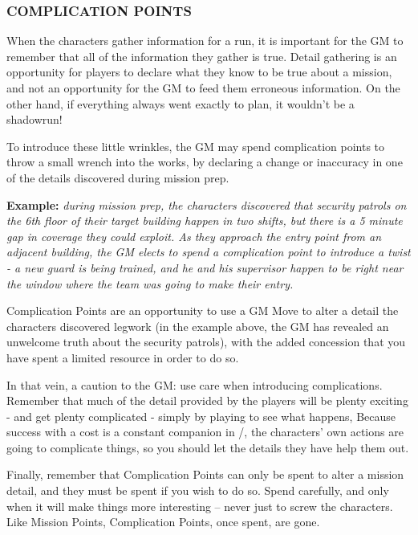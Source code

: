 \documentclass[oneside,10pt]{article}
\begin{document}
\begin{multicols}{2}
  \subsubsection{COMPLICATION POINTS}
  When the characters gather information for a run, it is important
  for the GM to remember that all of the information they gather is
  true. Detail gathering is an opportunity for players to declare what
  they know to be true about a mission, and not an opportunity for the
  GM to feed them erroneous information. On the other hand, if
  everything always went exactly to plan, it wouldn’t be a shadowrun!

  To introduce these little wrinkles, the GM may spend complication
  points to throw a small wrench into the works, by declaring a change
  or inaccuracy in one of the details discovered during mission prep.

  \begin{dent}
    \textbf{Example:}\textit{ during mission prep, the characters
      discovered that security patrols on the 6th floor of their
      target building happen in two shifts, but there is a 5 minute
      gap in coverage they could exploit. As they approach the entry
      point from an adjacent building, the GM elects to spend a
      complication point to introduce a twist - a new guard is being
      trained, and he and his supervisor happen to be right near the
      window where the team was going to make their entry.}
  \end{dent}

  Complication Points are an opportunity to use a GM Move to alter a
  detail the characters discovered legwork (in the example above, the
  GM has revealed an unwelcome truth about the security patrols), with
  the added concession that you have spent a limited resource in order
  to do so.

  In that vein, a caution to the GM: use care when introducing
  complications. Remember that much of the detail provided by the
  players will be plenty exciting - and get plenty complicated -
  simply by playing to see what happens, Because success with a cost
  is a constant companion in \SW/, the characters’ own actions are
  going to complicate things, so you should let the details they have
  help them out.

  Finally, remember that Complication Points can only be spent to
  alter a mission detail, and they must be spent if you wish to do
  so. Spend carefully, and only when it will make things more
  interesting – never just to screw the characters.  Like Mission
  Points, Complication Points, once spent, are gone.


\end{multicols}
\end{document}

